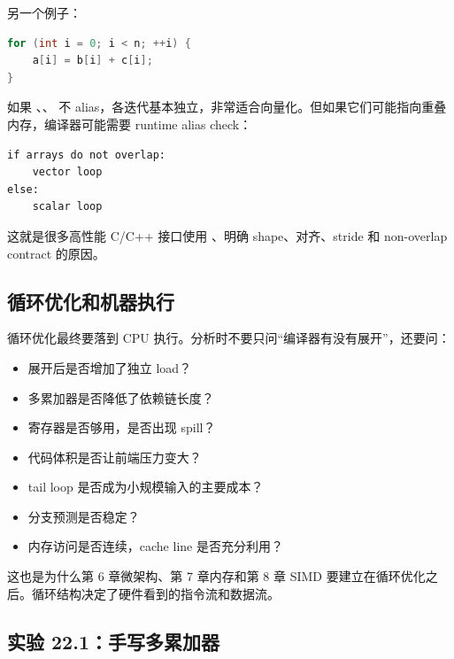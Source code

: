另一个例子：

\begin{lstlisting}[language=C++]
for (int i = 0; i < n; ++i) {
    a[i] = b[i] + c[i];
}
\end{lstlisting}

如果 、、 不 alias，各迭代基本独立，非常适合向量化。但如果它们可能指向重叠内存，编译器可能需要 runtime alias check：

\begin{lstlisting}
if arrays do not overlap:
    vector loop
else:
    scalar loop
\end{lstlisting}

这就是很多高性能 C/C++ 接口使用 、明确 shape、对齐、stride 和 non-overlap contract 的原因。

\subsection{循环优化和机器执行}

循环优化最终要落到 CPU 执行。分析时不要只问“编译器有没有展开”，还要问：

\begin{itemize}
  \item 展开后是否增加了独立 load？
  \item 多累加器是否降低了依赖链长度？
  \item 寄存器是否够用，是否出现 spill？
  \item 代码体积是否让前端压力变大？
  \item tail loop 是否成为小规模输入的主要成本？
  \item 分支预测是否稳定？
  \item 内存访问是否连续，cache line 是否充分利用？
\end{itemize}

这也是为什么第 6 章微架构、第 7 章内存和第 8 章 SIMD 要建立在循环优化之后。循环结构决定了硬件看到的指令流和数据流。

\subsection{实验 22.1：手写多累加器}

